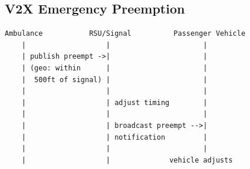 \subsection{V2X Emergency Preemption}

\begin{Verbatim}[frame=single,fontsize=\small]
Ambulance           RSU/Signal          Passenger Vehicle
    |                   |                      |
    | publish preempt ->|                      |
    | (geo: within      |                      |
    |  500ft of signal) |                      |
    |                   |                      |
    |                   | adjust timing        |
    |                   |                      |
    |                   | broadcast preempt -->|
    |                   | notification         |
    |                   |                      |
    |                   |              vehicle adjusts
\end{Verbatim}

